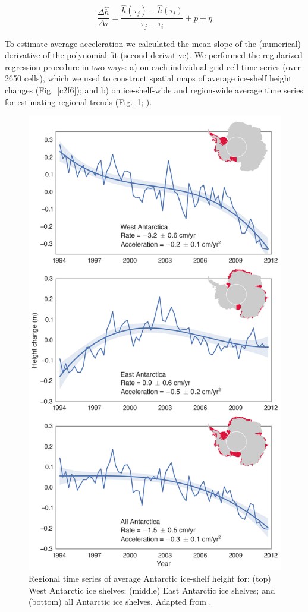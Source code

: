 \begin{equation}
  \frac{\Delta \hat h}{\Delta \tau} = 
    \frac{\hat h(\tau_j) - \hat h(\tau_i)}{\tau_j - \tau_i}
    + \dot p + \dot \eta
  \label{c2e6}
\end{equation}


To estimate average acceleration we calculated the mean slope of the (numerical) derivative of the polynomial fit (second derivative). We performed the regularized regression procedure in two ways: a) on each individual grid-cell time series (over 2650 cells), which we used to construct spatial maps of average ice-shelf height changes (Fig.~\ref{c2f6}); and b) on ice-shelf-wide and region-wide average time series for estimating regional trends (Fig.~\ref{c2f7}; \parencite{Paolo2015}). 


\begin{figure}[!ht]
  \centering
  \includegraphics[width=.71\textwidth]{img/tseries_v4.png}
  \caption[Regional time series of average Antarctic ice-shelf height]{
  \ssp \footnotesize
  Regional time series of average Antarctic ice-shelf height for: (top) West Antarctic ice shelves; (middle) East Antarctic ice shelves; and (bottom) all Antarctic ice shelves. Adapted from \textcite{Paolo2015}.
  } 
  \label{c2f7}
\end{figure}



